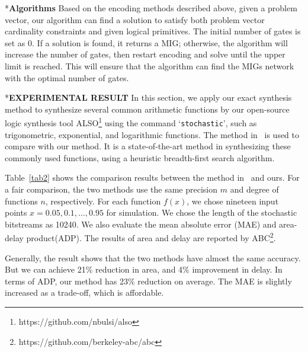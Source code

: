 \documentclass[conference,letterpaper]{IEEEtran}
\makeatletter
\renewcommand{\section}{\@startsection{section}{1}{0mm}
    {-\baselineskip}{0.001\baselineskip}{\bf\leftline}}
\renewcommand{\subsection}{\@startsection{subsection}{1}{0mm}
	{-\baselineskip}{0.001\baselineskip}{\bf\leftline}}
\makeatother
\begin{document}
\subsection*{\textbf{Algorithms }}
Based on the encoding methods described above, given a problem vector, our algorithm can find a solution to satisfy both problem vector cardinality constraints and given logical primitives. The initial number of gates is set as 0. If a solution is found, it returns a MIG; otherwise, the algorithm will increase the number of gates, then restart encoding and solve until the upper limit is reached. This will ensure that the algorithm can find the MIGs network with the optimal number of gates.

\section*{\textbf{\large EXPERIMENTAL RESULT}}
In this section, we apply our exact synthesis method to synthesize several common arithmetic functions by our open-source logic synthesis tool ALSO\footnote{https://github.com/nbulsi/also} using the command `\texttt{stochastic}', such as trigonometric, exponential, and logarithmic functions. The method in~\cite{2} is used to compare with our method. It is a state-of-the-art method in synthesizing these commonly used functions, using a heuristic breadth-first search algorithm. 

Table~\ref{tab2} shows the comparison results between the method in~\cite{2} and ours. For a fair comparison, the two methods use the same precision $m$ and degree of functions $n$, respectively. For each function $f(x)$, we chose nineteen input points $x=0.05, 0.1,..., 0.95$ for simulation. We chose the length of the stochastic bitstreams as 10240. We also evaluate the mean absolute error (MAE) and area-delay product(ADP). 
The results of area and delay are reported by ABC\footnote{https://github.com/berkeley-abc/abc}.

Generally, the result shows that the two methods have almost the same accuracy. But we can achieve 21\% reduction in area, and 4\% improvement in delay. In terms of ADP, our method has 23\% reduction on average.
The MAE is slightly increased as a trade-off, which is affordable.
\end{document}
